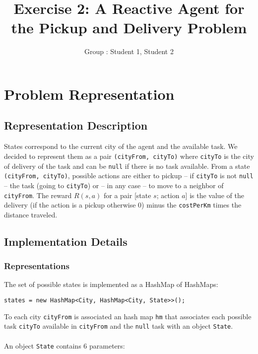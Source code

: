 \documentclass[11pt]{article}
\title{\bf Exercise 2: A Reactive Agent for the Pickup and Delivery Problem}
\author{Group \textnumero: Student 1, Student 2}
\begin{document}
\maketitle

\section{Problem Representation}

\subsection{Representation Description}

States correspond to the current city of the agent and the available task. We decided to represent them as a pair \verb|(cityFrom, cityTo)| where \verb|cityTo| is the city of delivery of the task and can be \verb|null| if there is no task available. From a state \verb|(cityFrom, cityTo)|, possible actions are either to pickup -- if \verb|cityTo| is not \verb|null| -- the task (going to \verb|cityTo|) or -- in any case -- to move to a neighbor of \verb|cityFrom|. The reward $R(s,a)$ for a pair [state $s$; action $a$] is the value of the delivery (if the action is a pickup otherwise 0) minus the \verb|costPerKm| times the distance traveled.

\subsection{Implementation Details}
\subsubsection{Representations}
The set of possible states is implemented as a HashMap of HashMaps:
\begin{verbatim}
states = new HashMap<City, HashMap<City, State>>();
\end{verbatim}
To each city \verb|cityFrom| is associated an hash map \verb|hm| that associates each possible task \verb|cityTo| available in \verb|cityFrom| and the \verb|null| task with an object \verb|State|.\\
\\
An object \verb|State| contains 6 parameters:
\end{document}
